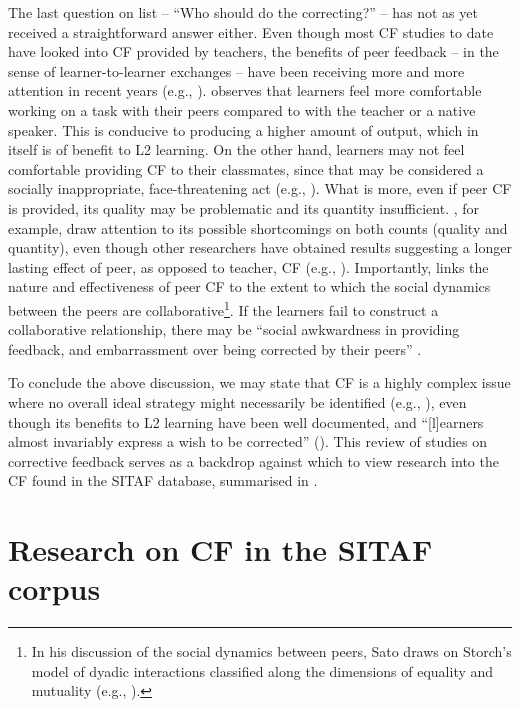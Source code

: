 \documentclass[output=paper,colorlinks,citecolor=brown,modfonts,nonflat]{../langscibook}
\begin{document}
The last question on  list – “Who should do the correcting?” – has not as yet received a straightforward answer either. Even though most CF studies to date have looked into CF provided by teachers, the benefits of peer feedback – in the sense of learner-to-learner exchanges – have been receiving more and more attention in recent years (e.g., \citealt{Adams2007,SatoLyster2012,Sato2017}). \citet{SatoInPress} observes that learners feel more comfortable working on a task with their peers compared to with the teacher or a native speaker. This is conducive to producing a higher amount of output, which in itself is of benefit to L2 learning. On the other hand, learners may not feel comfortable providing CF to their classmates, since that may be considered a socially inappropriate, face-threatening act (e.g., \citealt{Foster1998, Ballinger2015}). What is more, even if peer CF is provided, its quality may be problematic and its quantity insufficient. \citet{MackeyEtAl2003}, for example, draw attention to its possible shortcomings on both counts (quality and quantity), even though other researchers have obtained results suggesting a longer lasting effect of peer, as opposed to teacher, CF (e.g., \citealt{SippelJackson2015}). Importantly, \citet{Sato2017} links the nature and effectiveness of peer CF to the extent to which the social dynamics between the peers are collaborative\footnote{ {In his discussion of the social dynamics between peers, Sato draws on Storch’s model of dyadic interactions classified along the dimensions of equality and mutuality (e.g., \citealt{Storch2002}).}}. If the learners fail to construct a collaborative relationship, there may be “social awkwardness in providing feedback, and embarrassment over being corrected by their peers” \citep[27]{Sato2017}.

To conclude the above discussion, we may state that CF is a highly complex issue where no overall ideal strategy might necessarily be identified (e.g., \citealt{LysterEtAl2013}), even though its benefits to L2 learning have been well documented, and “[l]earners almost invariably express a wish to be corrected” (\citealt[606]{SheenEllis2011}). This review of studies on corrective feedback serves as a backdrop against which to view research into the CF found in the SITAF database, summarised in . 

\section{Research on CF in the SITAF corpus}\label{sec:scheuer:4}
\end{document}
